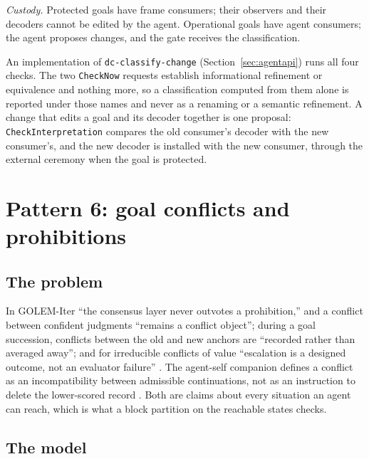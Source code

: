 \documentclass[11pt]{article}
\newcommand{\code}[1]{\texttt{#1}}
\theoremstyle{definition}
\theoremstyle{plain}
\begin{document}
\emph{Custody.} Protected goals have frame consumers; their observers and their decoders cannot be
edited by the agent. Operational goals have agent consumers; the agent proposes changes, and the
gate receives the classification.

An implementation of \code{dc-classify-change} (Section~\ref{sec:agentapi}) runs all four checks.
The two \code{CheckNow} requests establish informational refinement or equivalence and nothing
more, so a classification computed from them alone is reported under those names and never as a
renaming or a semantic refinement. A change that edits a goal and its decoder together is one
proposal: \code{CheckInterpretation} compares the old consumer's decoder with the new consumer's,
and the new decoder is installed with the new consumer, through the external ceremony when the
goal is protected.

\section{Pattern 6: goal conflicts and prohibitions}\label{sec:p6}

\subsection{The problem}

In GOLEM-Iter ``the consensus layer never outvotes a prohibition,'' and a conflict between
confident judgments ``remains a conflict object''; during a goal succession, conflicts between the
old and new anchors are ``recorded rather than averaged away''; and for irreducible conflicts of
value ``escalation is a designed outcome, not an evaluator failure'' \cite{golemspec}. The agent-self companion defines a conflict as an incompatibility between
admissible continuations, not as an instruction to delete the lower-scored record \cite{self1}.
Both are claims about every situation an agent can reach, which is what a block partition on the
reachable states checks.

\subsection{The model}
\end{document}

